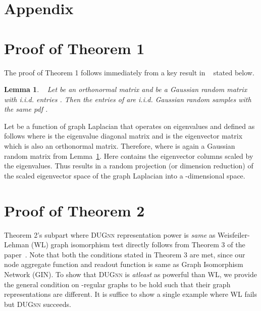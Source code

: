 \documentclass{article}
\newtheorem{lemma}{Lemma}
\begin{document}
\setlength{\bibsep}{0pt}
\medskip
\small




\section{Appendix}



\section{Proof of Theorem 1}



The proof of Theorem 1 follows immediately from a key result in ~\cite{paratte2016fast}  stated below.

\begin{lemma}~\cite{paratte2016fast} \label{lemma:projection} 
	Let  be an orthonormal matrix and   be a Gaussian random matrix with i.i.d. entries . Then the entries of  are i.i.d. Gaussian random samples with the same pdf  .
\end{lemma}

Let  be a function of graph Laplacian that operates on eigenvalues and defined as follows   where  is the eigenvalue diagonal matrix  and  is the eigenvector matrix which is also an orthonormal matrix. Therefore,  where  is again a  Gaussian random matrix from Lemma~\ref{lemma:projection}. Here  contains the eigenvector columns  scaled by the  eigenvalues. Thus  results in a random projection  (or dimension reduction) of the
scaled eigenvector space of the graph Laplacian into a -dimensional space. 


\section{Proof of Theorem 2}

Theorem 2's subpart where \textsc{DUGnn} representation power is \emph{same} as  Weisfeiler-Lehman (WL) graph isomorphism test  directly follows from  Theorem 3 of the paper~\cite{xu2018powerful}. Note that both the conditions  stated in Theorem 3 are met,  since our node aggregate function and readout function is same as  Graph Isomorphism Network (GIN). To show that \textsc{DUGnn} is \emph{atleast} as powerful than WL, we provide the general condition on -regular graphs to be hold such that their graph representations are different. It is suffice   to show  a single example where WL fails but \textsc{DUGnn} succeeds.
\end{document}
